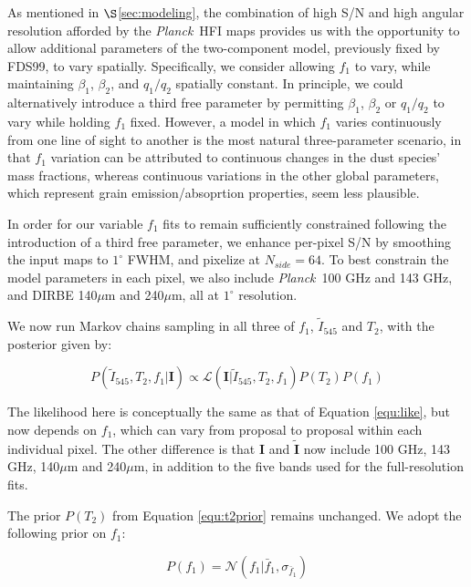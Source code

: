 \documentclass{emulateapj}
\newcommand{\PLANCK}{{\it Planck}}
\begin{document}
As mentioned in $\S$\ref{sec:modeling}, the combination of high S/N and high 
angular resolution afforded by the \PLANCK~HFI maps provides us with the 
opportunity to allow additional parameters of the two-component model, 
previously fixed by FDS99, to vary spatially. Specifically, we consider
allowing $f_1$ to vary, while maintaining $\beta_1$, $\beta_2$, and $q_1/q_2$
spatially constant. In principle, we could alternatively introduce a third free
parameter by permitting $\beta_1$, $\beta_2$ or $q_1/q_2$ to vary while holding
$f_1$ fixed. However, a model in which $f_1$ varies continuously from one line 
of sight to another is the most natural three-parameter scenario, in that $f_1$
variation can be attributed to continuous changes in the dust species' mass
fractions, whereas continuous variations in the other global parameters, which 
represent grain emission/absoprtion properties, seem less plausible.

In order for our variable $f_1$ fits to remain sufficiently constrained 
following the introduction of a third free parameter, we enhance per-pixel S/N 
by smoothing the input maps to $1^{\circ}$ FWHM, and pixelize at $N_{side}=64$.
To best constrain the model parameters in each pixel, we also include 
\PLANCK~100 GHz and 143 GHz, and DIRBE 140$\mu$m and 240$\mu$m, all at 
$1^{\circ}$ resolution.

We now run Markov chains sampling in all three of $f_1$, $\tilde{I}_{545}$ and 
$T_2$, with the posterior given by:

\begin{equation}
\label{eqn:f1post}
P(\tilde{I}_{545}, T_2, f_1|\mathbf{I}) \propto \mathcal{L}(\mathbf{I}|\tilde{I}_{545}, T_2, f_1)P(T_2)P(f_1)
\end{equation}

The likelihood here is conceptually the same as that of Equation 
\ref{equ:like}, but now depends on $f_1$, which can vary from proposal to 
proposal within each individual pixel. The other difference is that 
$\mathbf{I}$ and $\mathbf{\tilde{I}}$ now include 100 GHz, 
143 GHz, 140$\mu$m and 240$\mu$m, in addition to the five bands used for the 
full-resolution fits.

The prior $P(T_2)$ from Equation \ref{equ:t2prior} 
remains unchanged. We adopt the following prior on $f_1$:

\begin{equation} \label{equ:f1prior}
P(f_1) = \mathcal{N}(f_1|\bar{f}_1, \sigma_{\bar{f}_1})
\end{equation}
\end{document}
